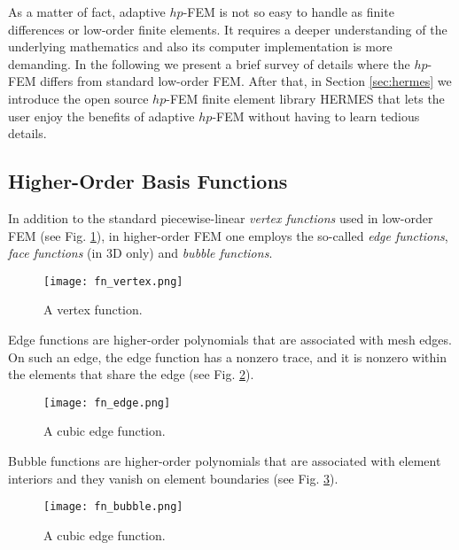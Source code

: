\documentclass[final,3p,times,twocolumn]{elsarticle}
\begin{document}
As a matter of fact, adaptive $hp$-FEM is not so easy to handle 
as finite differences or low-order finite elements. It requires 
a deeper understanding of the underlying mathematics and also its 
computer implementation is more demanding. In the following 
we present a brief survey of details where the $hp$-FEM
differs from standard low-order FEM. After that, in Section 
\ref{sec:hermes} we introduce the open source $hp$-FEM finite 
element library HERMES that lets the user enjoy the benefits 
of adaptive $hp$-FEM without having to learn tedious details.

\subsection{Higher-Order Basis Functions}

In addition to the standard piecewise-linear
{\em vertex functions} used in low-order
FEM (see Fig. \ref{fig:vertex-fn}), 
in higher-order FEM one employs 
the so-called {\em edge functions}, 
{\em face functions} (in 3D only) and 
{\em bubble functions}.

\begin{figure}[!htb]
\begin{center}
 {
\texttt{[image: fn\_vertex.png]}
}
\end{center}
\caption{A vertex function.}
\label{fig:vertex-fn}
\end{figure}

Edge functions are higher-order polynomials
that are associated with mesh edges. On such 
an edge, the edge function has a nonzero trace,
and it is nonzero within the elements that share
the edge (see Fig. \ref{fig:edge-fn}).

\begin{figure}[!htb]
\begin{center}
 {
\texttt{[image: fn\_edge.png]}
}
\end{center}
\caption{A cubic edge function.}
\label{fig:edge-fn}
\end{figure}

Bubble functions are higher-order polynomials
that are associated with element interiors and 
they vanish on element boundaries (see Fig. 
\ref{fig:bubble-fn}).

\begin{figure}[!htb]
\begin{center}
 {
\texttt{[image: fn\_bubble.png]}
}
\end{center}
\caption{A cubic edge function.}
\label{fig:bubble-fn}
\end{figure}
\end{document}
